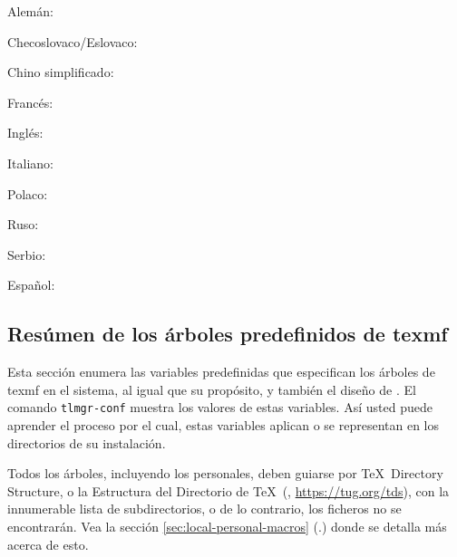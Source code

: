 \documentclass{article}
\begin{document}
\begin{itemize*}
\item{Alemán:} 
\item{Checoslovaco/Eslovaco:} 
\item{Chino simplificado:} 
\item{Francés:} 
\item{Inglés:} 
\item{Italiano:} 
\item{Polaco:} 
\item{Ruso:} 
\item{Serbio:} 
\item{Español:} 
\end{itemize*}

\subsection{Resúmen de los árboles predefinidos de texmf}
\label{sec:texmftrees}

Esta sección enumera las variables predefinidas que especifican los
árboles de texmf en el sistema, al igual que su propósito, y también
el diseño de \TL{}. El comando \texttt{tlmgr-conf} muestra los valores
de estas variables. Así usted puede aprender el proceso por el cual,
estas variables aplican o se representan en los directorios de su
instalación.

Todos los árboles, incluyendo los personales, deben guiarse por \TeX\
Directory Structure, o la Estructura del Directorio de \TeX\ (\TDS,
\url{https://tug.org/tds}), con la innumerable lista de
subdirectorios, o de lo contrario, los ficheros no se encontrarán. Vea
la sección \ref{sec:local-personal-macros}
(\p.\pageref{sec:local-personal-macros}) donde se detalla más acerca
de esto.
\end{document}
